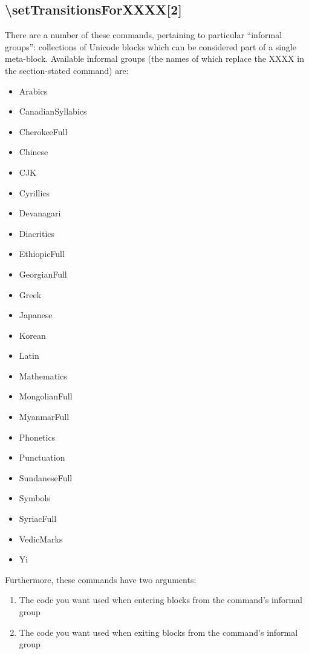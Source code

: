 \documentclass{article}
\newenvironment{itemlist}{%
  \begin{itemize}
  \setlength{\itemsep}{0pt}
  \setlength{\parsep}{0pt}
  \setlength{\topsep}{0pt}
  \setlength{\partopsep}{0pt}
  \setlength{\parskip}{0pt}
  \setlength{\labelsep}{5pt}}%
{
  \end{itemize}}
\newenvironment{numberlist}{%
  \begin{enumerate}
  \setlength{\itemsep}{0pt}
  \setlength{\parsep}{0pt}
  \setlength{\topsep}{0pt}
  \setlength{\partopsep}{0pt}
  \setlength{\parskip}{0pt}
  \setlength{\labelsep}{5pt}}%
{
  \end{enumerate}}
\begin{document}
    \subsection{\textbackslash setTransitionsForXXXX[2]}

      There are a number of these commands, pertaining to particular “informal groups”: collections of Unicode blocks which can be considered part of a single meta-block. Available informal groups (the names of which replace the XXXX in the section-stated command) are:

      \begin{itemlist}
        \item Arabics
        \item CanadianSyllabics
        \item CherokeeFull
        \item Chinese
        \item CJK
        \item Cyrillics
        \item Devanagari
        \item Diacritics
        \item EthiopicFull
        \item GeorgianFull
        \item Greek
        \item Japanese
        \item Korean
        \item Latin
        \item Mathematics
        \item MongolianFull
        \item MyanmarFull
        \item Phonetics
        \item Punctuation
        \item SundaneseFull
        \item Symbols
        \item SyriacFull
        \item VedicMarks
        \item Yi
      \end{itemlist}

      Furthermore, these commands have two arguments:

      \begin{numberlist}
        \item The code you want used when entering blocks from the command's informal group
        \item The code you want used when exiting blocks from the command's informal group
      \end{numberlist}
\end{document}
